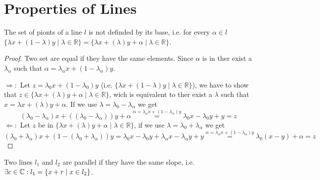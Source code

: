 \section{Properties of Lines}

\begin{lemma} 
    \label{lem:line_pionts_iff}
    \leanok
    The set of pionts of a line $l$ is not definded by its base, i.e. for every $\alpha\in l$  $\{\lambda x+(1-\lambda)y\mid\lambda\in\mathbb{R}\} = \{\lambda x+(\lambda)y+\alpha\mid\lambda\in\mathbb{R}\}$.
\end{lemma}
\begin{proof}
    Two set are equal if they have the same elements. 
    Since $\alpha$ is in ther exist a $\lambda_{\alpha}$ such that $\alpha = \lambda_{\alpha} x+(1-\lambda_{\alpha})y$.
    
    $\Rightarrow:$ Let $z=\lambda_0 x + (1-\lambda_0)y$ (i.e. $\{\lambda x+(1-\lambda)y\mid\lambda\in\mathbb{R}\}$), we have to show that $z\in \{\lambda x+(\lambda)y+\alpha\mid\lambda\in\mathbb{R}\}$,
    wich is equivalent to ther exist a $\lambda$ such that $x = \lambda x+(\lambda)y+\alpha$. If we use $\lambda = \lambda_0 - \lambda_{\alpha} $ we get
    $$(\lambda_0 - \lambda_{\alpha}) x + ((\lambda_0 - \lambda_{\alpha}))y + \alpha  \overset{\alpha = \lambda_{\alpha} x+(1-\lambda_{\alpha})y}{=} \lambda_0 x - \lambda_0 y + y = z$$ %
    $\Leftarrow:$ Let $z$ be in $\{\lambda x+(\lambda)y+\alpha\mid\lambda\in\mathbb{R}\}$, if we use $\lambda = \lambda_0 + \lambda_{\alpha} $ we get
    $$(\lambda_0 + \lambda_{\alpha}) x + (1 -(\lambda_0 + \lambda_{\alpha}))y = \lambda_0 x - \lambda_0 y + \lambda_{\alpha} x - \lambda_{\alpha} y + y \overset{\alpha = \lambda_{\alpha} x+(1-\lambda_{\alpha})y}{=}  \lambda_0 (x - y) + \alpha = z$$
\end{proof}

\begin{definition}[parallel]
    \label{def:parallel}
    \leanok
    Two lines $l_1$ and $l_2$ are parallel if they have the same slope, i.e. $\exists c\in\mathbb{C}: l_1 = \{x + r \mid x\in l_2\}$.
\end{definition}

